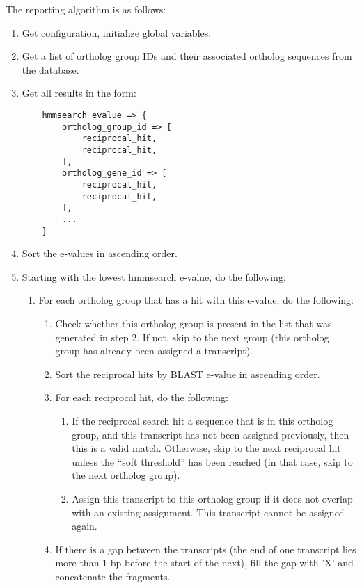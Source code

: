 The reporting algorithm is as follows:

\begin{enumerate}
	\item Get configuration, initialize global variables.
	\item Get a list of ortholog group IDs and their associated ortholog sequences
		from the database.
	\item Get all results in the form:
	\begin{lstlisting}
	hmmsearch_evalue => {
		ortholog_group_id => [
			reciprocal_hit,
			reciprocal_hit,
		],
		ortholog_gene_id => [
			reciprocal_hit,
			reciprocal_hit,
		],
		...
	}
	\end{lstlisting}
	\item Sort the e-values in ascending order.
	\item Starting with the lowest hmmsearch e-value, do the following:
	\begin{enumerate}
		\item For each ortholog group that has a hit with this e-value, do the following:
		\begin{enumerate}
			\item Check whether this ortholog group is present in the list that was
				generated in step 2. If not, skip to the next group (this ortholog group
				has already been assigned a transcript).
			\item Sort the reciprocal hits by BLAST e-value in ascending order.
			\item For each reciprocal hit, do the following:
			\begin{enumerate}
				\item If the reciprocal search hit a sequence that is in this ortholog
					group, and this transcript has not been assigned previously, then this
					is a valid match. Otherwise, skip to the next reciprocal hit unless
					the ``soft threshold'' has been reached (in that case, skip to the
					next ortholog group).
				\item Assign this transcript to this ortholog group if it does not
					overlap with an existing assignment. This transcript cannot be
					assigned again.
			\end{enumerate}
			\item If there is a gap between the transcripts (the end of one transcript
				lies more than 1 bp before the start of the next), fill the gap with
				'X' and concatenate the fragments.
		\end{enumerate}
	\end{enumerate}
\end{enumerate}

